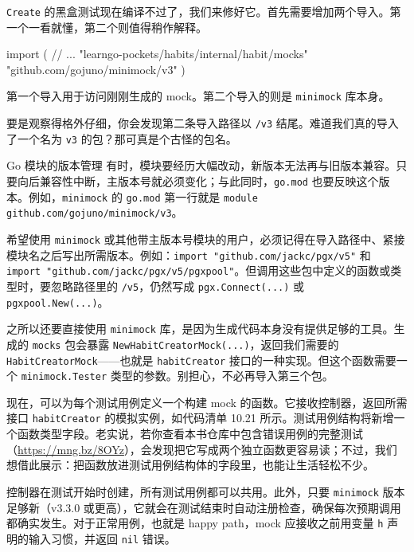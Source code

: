 \texttt{Create} 的黑盒测试现在编译不过了，我们来修好它。首先需要增加两个导入。第一个一看就懂，第二个则值得稍作解释。

\begin{gocode}[]
import (
    // ...
    "learngo-pockets/habits/internal/habit/mocks"
    "github.com/gojuno/minimock/v3"
)
\end{gocode}

第一个导入用于访问刚刚生成的 mock。第二个导入的则是 \texttt{minimock} 库本身。

要是观察得格外仔细，你会发现第二条导入路径以 \texttt{/v3} 结尾。难道我们真的导入了一个名为 \texttt{v3} 的包？那可真是个古怪的包名。

\begin{infobox}{Go 模块的版本管理}
有时，模块要经历大幅改动，新版本无法再与旧版本兼容。只要向后兼容性中断，主版本号就必须变化；与此同时，\texttt{go.mod} 也要反映这个版本。例如，\texttt{minimock} 的 \texttt{go.mod} 第一行就是 \texttt{module github.com/gojuno/minimock/v3}。

希望使用 \texttt{minimock} 或其他带主版本号模块的用户，必须记得在导入路径中、紧接模块名之后写出所需版本。例如：\texttt{import "github.com/jackc/pgx/v5"} 和 \texttt{import "github.com/jackc/pgx/v5/pgxpool"}。但调用这些包中定义的函数或类型时，要忽略路径里的 \texttt{/v5}，仍然写成 \texttt{pgx.Connect(...)} 或 \texttt{pgxpool.New(...)}。
\end{infobox}

之所以还要直接使用 \texttt{minimock} 库，是因为生成代码本身没有提供足够的工具。生成的 \texttt{mocks} 包会暴露 \texttt{NewHabitCreatorMock(...)}，返回我们需要的 \texttt{HabitCreatorMock}——也就是 \texttt{habitCreator} 接口的一种实现。但这个函数需要一个 \texttt{minimock.Tester} 类型的参数。别担心，不必再导入第三个包。

现在，可以为每个测试用例定义一个构建 mock 的函数。它接收控制器，返回所需接口 \texttt{habitCreator} 的模拟实例，如代码清单 10.21 所示。测试用例结构将新增一个函数类型字段。老实说，若你查看本书仓库中包含错误用例的完整测试（\url{https://mng.bz/8OYz}），会发现把它写成两个独立函数更容易读；不过，我们想借此展示：把函数放进测试用例结构体的字段里，也能让生活轻松不少。

控制器在测试开始时创建，所有测试用例都可以共用。此外，只要 \texttt{minimock} 版本足够新（v3.3.0 或更高），它就会在测试结束时自动注册检查，确保每次预期调用都确实发生。对于正常用例，也就是 happy path，mock 应接收之前用变量 \texttt{h} 声明的输入习惯，并返回 \texttt{nil} 错误。


